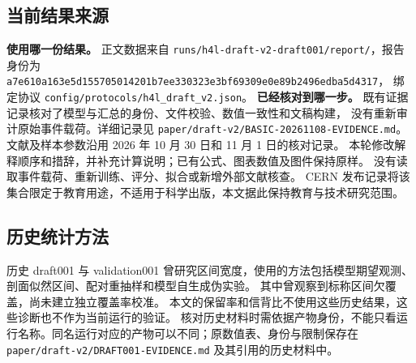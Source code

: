 \documentclass[11pt,a4paper,fontset=fandol,scheme=plain]{ctexart}
\begin{document}
\subsection{当前结果来源}
\textbf{使用哪一份结果。} 正文数据来自 \nolinkurl{runs/h4l-draft-v2-draft001/report/}，报告身份为
\nolinkurl{a7e610a163e5d155705014201b7ee330323e3bf69309e0e89b2496edba5d4317}，
绑定协议 \nolinkurl{config/protocols/h4l_draft_v2.json}。
\textbf{已经核对到哪一步。} 既有证据记录核对了模型与汇总的身份、文件校验、数值一致性和文稿构建，
没有重新审计原始事件载荷。详细记录见 \nolinkurl{paper/draft-v2/BASIC-20261108-EVIDENCE.md}。
文献及样本参数沿用 2026 年 10 月 30 日和 11 月 1 日的核对记录。
本轮修改解释顺序和措辞，并补充计算说明；已有公式、图表数值及图件保持原样。
没有读取事件载荷、重新训练、评分、拟合或新增外部文献核查。
CERN 发布记录将该集合限定于教育用途，不适用于科学出版，本文据此保持教育与技术研究范围。

\subsection{历史统计方法}\label{app:interval}
历史 draft001 与 validation001 曾研究区间宽度，使用的方法包括模型期望观测、剖面似然区间、配对重抽样和模型自生成伪实验。
其中曾观察到标称区间欠覆盖，尚未建立独立覆盖率校准。
本文的保留率和信背比不使用这些历史结果，这些诊断也不作为当前运行的验证。
核对历史材料时需依据产物身份，不能只看运行名称。同名运行对应的产物可以不同；原数值表、身份与限制保存在
\nolinkurl{paper/draft-v2/DRAFT001-EVIDENCE.md} 及其引用的历史材料中。
\end{document}
